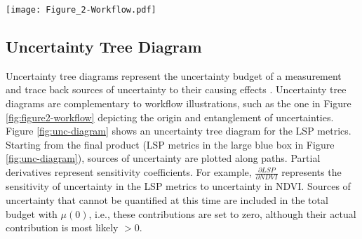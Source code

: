 \begin{figure*}
    \centering
    \texttt{[image: Figure\_2-Workflow.pdf]}
    \caption{Overview of the workflow for uncertainty ($\mu$) propagation. Using the \gls{S2-RUT} radiometric uncertainties are propagated from \gls{TOA}reflectance factors through atmospheric correction into NDVI, \gls{EVI} and \gls{GLAI} as well as \gls{SCL} uncertainty in a first \gls{MC} framework working on single \gls{S2}scenes (a). Multiple ($n$) \gls{S2}scenes acquired over an entire growing season are processed to obtain \gls{LSP} metrics from a trait (e.g., \gls{NDVI}) time series (b). Uncertainties obtained in the first  \gls{MC} framework are feed into (b) for a second  \gls{MC} sampling to derive \gls{LSP} uncertainty. Inter-scene (i.e., multi-temporal) error correlation is set to full correlation (c) and zero correlation (d) to include the two possible extreme cases for \gls{LSP} uncertainty retrieval.}
    \label{fig:figure2-workflow}
\end{figure*}

\subsection{Uncertainty Tree Diagram}
\label{subsec:uncertainty-tree-diagram}
Uncertainty tree diagrams represent the uncertainty budget of a measurement and trace back sources of uncertainty to their causing effects \citep{ma_uncertainty_2020,mittaz_applying_2019}. Uncertainty tree diagrams are complementary to workflow illustrations, such as the one in Figure \ref{fig:figure2-workflow} depicting the origin and entanglement of uncertainties. Figure \ref{fig:unc-diagram} shows an uncertainty tree diagram for the \gls{LSP} metrics. Starting from the final product (LSP metrics in the large blue box in Figure \ref{fig:unc-diagram}), sources of uncertainty are plotted along paths. Partial derivatives represent sensitivity coefficients. For example, $\frac{\partial LSP}{\partial NDVI}$ represents the sensitivity of uncertainty in the \gls{LSP} metrics to uncertainty in NDVI. Sources of uncertainty that cannot be quantified at this time are included in the total budget with $\mu(0)$, i.e., these contributions are set to zero, although their actual contribution is most likely $> 0$.

